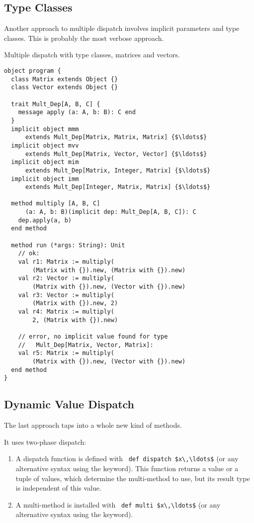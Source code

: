 \subsection{Type Classes}

Another approach to multiple dispatch involves implicit parameters and type classes. This is probably the most verbose approach. 

\example Multiple dispatch with type classes, matrices and vectors. 
\begin{lstlisting}
object program {
  class Matrix extends Object {}
  class Vector extends Object {}
  
  trait Mult_Dep[A, B, C] {
    message apply (a: A, b: B): C end
  }
  implicit object mmm 
      extends Mult_Dep[Matrix, Matrix, Matrix] {$\ldots$}
  implicit object mvv 
      extends Mult_Dep[Matrix, Vector, Vector] {$\ldots$}
  implicit object mim 
      extends Mult_Dep[Matrix, Integer, Matrix] {$\ldots$}
  implicit object imm 
      extends Mult_Dep[Integer, Matrix, Matrix] {$\ldots$}
  
  method multiply [A, B, C]
      (a: A, b: B)(implicit dep: Mult_Dep[A, B, C]): C
    dep.apply(a, b)
  end method
  
  method run (*args: String): Unit
    // ok:
    val r1: Matrix := multiply(
        (Matrix with {}).new, (Matrix with {}).new)
    val r2: Vector := multiply(
        (Matrix with {}).new, (Vector with {}).new)
    val r3: Vector := multiply(
        (Matrix with {}).new, 2)
    val r4: Matrix := multiply(
        2, (Matrix with {}).new)
    
    // error, no implicit value found for type
    //   Mult_Dep[Matrix, Vector, Matrix]:
    val r5: Matrix := multiply(
        (Matrix with {}).new, (Vector with {}).new)
  end method
}
\end{lstlisting}





\subsection{Dynamic Value Dispatch}
\label{sec:dynamic-value-dispatch}

The last approach taps into a whole new kind of methods. 

It uses two-phase dispatch:
\begin{enumerate}
  \item A dispatch function is defined with ~\lstinline!def dispatch $x\,\ldots$! (or any alternative syntax using the  keyword). This function returns a value or a tuple of values, which determine the multi-method to use, but its result type is independent of this value. 
  \item A multi-method is installed with ~\lstinline!def multi $x\,\ldots$! (or any alternative syntax using the  keyword).
\end{enumerate}

